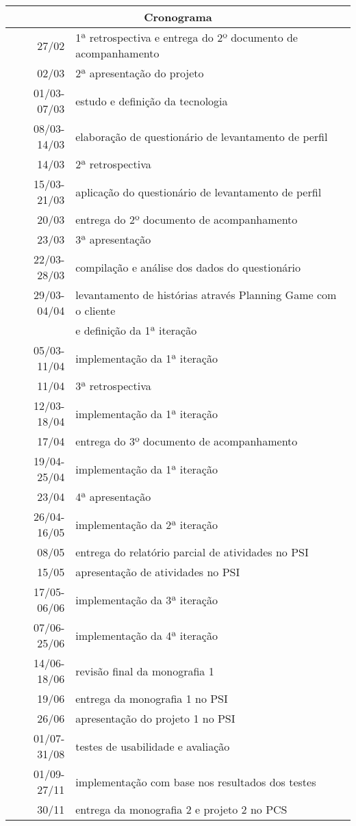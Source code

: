 \documentclass[a4paper,12pt,font=plain,header=plain]{abnt}
\begin{document}
	\begin{tabular}[|l|]{ |r|l| }
	\hline
		\multicolumn{2}{|c|}{\textbf{Cronograma}} \\
	\hline
		27/02 & 1ª retrospectiva e entrega do 2º documento de acompanhamento \\
	\hline
		02/03 & 2ª apresentação do projeto \\
	\hline
		01/03-07/03 & estudo e definição da tecnologia \\
	\hline
		08/03-14/03 & elaboração de questionário de levantamento de perfil \\
	\hline
		14/03 & 2ª retrospectiva \\
	\hline
		15/03-21/03 & aplicação do questionário de levantamento de perfil \\
	\hline
		20/03 & entrega do 2º documento de acompanhamento \\
	\hline
		23/03 & 3ª apresentação \\
	\hline
		22/03-28/03 & compilação e análise dos dados do questionário \\
	\hline
		29/03-04/04 & levantamento de histórias através Planning Game com o cliente \\
			    & e definição da 1ª iteração \\
	\hline
		05/03-11/04 & implementação da 1ª iteração \\
	\hline
		11/04 & 3ª retrospectiva \\
	\hline
		12/03-18/04 & implementação da 1ª iteração \\
	\hline
		17/04 & entrega do 3º documento de acompanhamento \\
	\hline
		19/04-25/04 & implementação da 1ª iteração \\
	\hline
		23/04 & 4ª apresentação \\
	\hline
		26/04-16/05 & implementação da 2ª iteração \\
	\hline
		08/05 & entrega do relatório parcial de atividades no PSI \\
	\hline
		15/05 & apresentação de atividades no PSI \\
	\hline
		17/05-06/06 & implementação da 3ª iteração \\
	\hline
		07/06-25/06 & implementação da 4ª iteração \\
	\hline
		14/06-18/06 & revisão final da monografia 1 \\
	\hline
		19/06 & entrega da monografia 1 no PSI \\
	\hline
		26/06 & apresentação do projeto 1 no PSI \\
	\hline
		01/07-31/08 & testes de usabilidade e avaliação \\
	\hline
		01/09-27/11 & implementação com base nos resultados dos testes \\
	\hline
		30/11 & entrega da monografia 2 e projeto 2 no PCS \\
	\hline
	\end{tabular} \\
\end{document}
